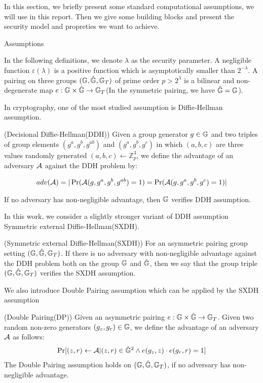 In this section, we briefly present some standard computational assumptions, we will use in this report.  
Then we give some building blocks and present the security model and propreties we want to achieve.

\begin{subsection}{Assumptions}
  
  In the following definitions, we denote $\lambda$ as the security parameter.
  A negligible function $\varepsilon(\lambda)$ is a positive function which is asymptotically smaller than $2^{-\lambda}$.
  A pairing on three groups $(\mathbb{G}, \hat{\mathbb{G}}, \mathbb{G}_T)$ of prime order $p > 2^\lambda$ is a bilinear and non-degenerate map $e : \mathbb{G} \times \hat{\mathbb{G}} \to \mathbb{G}_T$(In the symmetric pairing, we have $\hat{\mathbb{G}} = \mathbb{G}$). 
  
  In cryptography, one of the most studied assumption is Diffie-Hellman assumption. 

  \begin{myDef}{(Decisional Diffie-Hellman(DDH))}
    Given a group generator $g \in \mathbb{G}$ and two triples of group elements $(g^a, g^b, g^{ab})$ and $(g^a, g^b, g^c)$ in which $(a, b, c)$ are three values randomly generated  $(a, b, c) \gets \mathbb{Z}_p^3$, we define the advantage of an adversary $\mathcal{A}$ against the DDH problem by:

    \begin{align*}
      adv(\mathcal{A}) = |\operatorname{Pr}(\mathcal{A}(g, g^a, g^b, g^{ab}) = 1) = \operatorname{Pr}(\mathcal{A}(g, g^a, g^b, g^c) = 1)|
    \end{align*}

    If no adversary has non-negligible advantage, then $\mathbb{G}$ verifies DDH assumption.
  \end{myDef}

  In this work, we consider a slightly stronger variant of DDH assumption Symmetric external Diffie-Hellman(SXDH).
  
  \begin{myDef}{(Symmetric external Diffie-Hellman(SXDH))}
    For an asymmetric pairing group setting $(\mathbb{G}, \hat{\mathbb{G}}, \mathbb{G}_T)$. If there is no adversary with non-negligible advantage against the DDH problem both on the group $\mathbb{G}$ and $\hat{\mathbb{G}}$, then we say that the group triple $(\mathbb{G}, \hat{\mathbb{G}}, \mathbb{G}_T)$ verifies the SXDH assumption.
  \end{myDef}

  We also introduce Double Pairing assumption which can be applied by the SXDH assumption
  
  \begin{myDef}{(Double Pairing(DP))}
    Given an asymmetric pairing $e:\mathbb{G} \times \hat{\mathbb{G}} \to \mathbb{G}_T$. Given two random non-zero generators $(g_z, g_r) \in \mathbb{G}$, we define the advantage of an adversary $\mathcal{A}$ as follows:
    \begin{align*}
      \operatorname{Pr}[(z, r) \gets \mathcal{A}| (z, r)\in \hat{\mathbb{G}}^2 \wedge e(g_z, z) \cdot e(g_r, r) = 1]
    \end{align*}
    The Double Pairing assumption holds on $(\mathbb{G}, \hat{\mathbb{G}}, \mathbb{G}_T)$, if no adversary has non-negligible advantage.
  \end{myDef}


\end{subsection}
